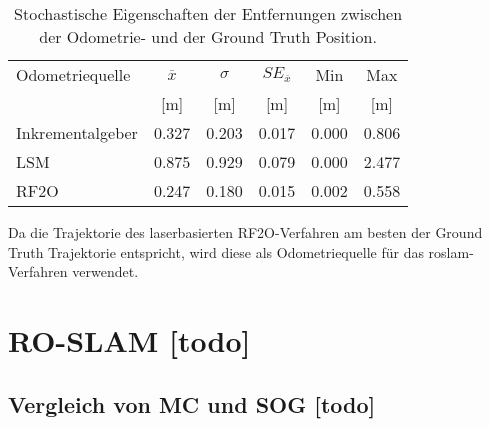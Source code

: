 \begin{table}
	\centering
	\begin{tabular}{||l||c|c|c||c|c||}
		\hline
		Odometriequelle & $\overline{x}$ & $\sigma$ & $SE_{\overline{x}}$ & Min & Max \\
		& [\si{\meter}] & [\si{\meter}] & [\si{\meter}] & [\si{\meter}] & [\si{\meter}] \\
		\hline
		\hline
		Inkrementalgeber & \num{0.327} & \num{0.203} & \num{0.017} & \num{0.000} & \num{0.806} \\
		LSM & \num{0.875} & \num{0.929} & \num{0.079} & \num{0.000} & \num{2.477} \\
		RF2O & \num{0.247} & \num{0.180} & \num{0.015} & \num{0.002} & \num{0.558} \\
		\hline
	\end{tabular}
	\caption{Stochastische Eigenschaften der Entfernungen zwischen der Odometrie- und der Ground Truth Position.}
	\label{tab:stochastik_odometrie_quellen}
\end{table}

Da die Trajektorie des laserbasierten RF2O-Verfahren am besten der Ground Truth Trajektorie entspricht, wird diese als Odometriequelle für das \gls{roslam}-Verfahren verwendet.


%
%	
%
\section{RO-SLAM [todo]}


%
%
%
\subsection{Vergleich von MC und SOG [todo]}


